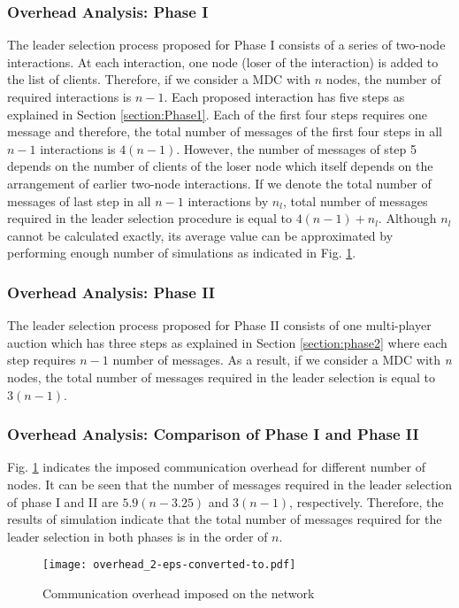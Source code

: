 \documentclass[journal,12pt, onecolumn]{IEEEtran}
\begin{document}
\subsubsection{Overhead Analysis: Phase I} \label{Performance Overhead_1}
The leader selection process proposed for Phase I consists of a series of two-node interactions. At each interaction, one node (loser of the interaction) is added to the list of clients. Therefore, if we consider a MDC with $n$ nodes, the number of required interactions is $n-1$. Each proposed interaction has five steps as explained in Section \ref{section:Phase1}. 
Each of the first four steps requires one message and therefore, the total number of messages of the first four steps in all $n-1$ interactions is $4(n-1)$. However, the number of messages of step 5 depends on the number of clients of the loser node which itself depends on the arrangement of earlier two-node interactions. If we denote the total number of messages of last step in all $n-1$ interactions by $n_l$, total number of messages required in the leader selection procedure is equal to $4(n-1)+ n_l$. Although $n_l$ cannot be calculated exactly, its average value can be approximated by performing enough number of simulations as indicated in Fig. \ref{figure 10}.

\subsubsection{Overhead Analysis: Phase II}
The leader selection process proposed for Phase II consists of one multi-player auction which has three steps as explained in Section \ref{section:phase2} where each step requires $n-1$ number of messages. As a result, if we consider a MDC with \textit{n} nodes, the total number of messages required in the leader selection is equal to $3(n-1)$.
\subsubsection{Overhead Analysis: Comparison of Phase I and Phase II}
Fig. \ref{figure 10} indicates the imposed communication overhead for different number of nodes. It can be seen that the number of messages required in the leader selection of phase I and II are $5.9(n-3.25)$ and $3(n-1)$, respectively. Therefore, the results of simulation indicate that the total number of messages required for the leader selection in both phases is in the order of $n$.

\begin{figure}
\centering
      \texttt{[image: overhead\_2-eps-converted-to.pdf]}
      \caption{Communication overhead imposed on the network}
\label{figure 10}
\end{figure}
\end{document}
